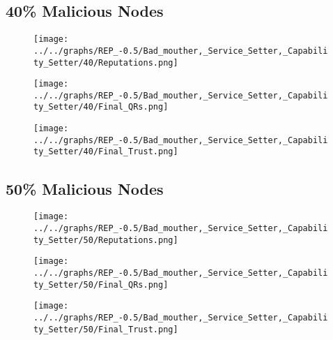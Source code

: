 \begin{minipage}[t]{0.49\columnwidth}
\subsection*{40\% Malicious Nodes}
    \begin{figure}[H]
        \centering
        \texttt{[image: ../../graphs/REP\_-0.5/Bad\_mouther,\_Service\_Setter,\_Capability\_Setter/40/Reputations.png]}
    \end{figure}
    \begin{figure}[H]
        \centering
        \texttt{[image: ../../graphs/REP\_-0.5/Bad\_mouther,\_Service\_Setter,\_Capability\_Setter/40/Final\_QRs.png]}
    \end{figure}
\end{minipage}
\begin{minipage}[t]{0.49\columnwidth}
    \begin{figure}[H]
        \centering
        \texttt{[image: ../../graphs/REP\_-0.5/Bad\_mouther,\_Service\_Setter,\_Capability\_Setter/40/Final\_Trust.png]}
    \end{figure}
\end{minipage}

\begin{minipage}[t]{0.49\columnwidth}
\subsection*{50\% Malicious Nodes}
    \begin{figure}[H]
        \centering
        \texttt{[image: ../../graphs/REP\_-0.5/Bad\_mouther,\_Service\_Setter,\_Capability\_Setter/50/Reputations.png]}
    \end{figure}
    \begin{figure}[H]
        \centering
        \texttt{[image: ../../graphs/REP\_-0.5/Bad\_mouther,\_Service\_Setter,\_Capability\_Setter/50/Final\_QRs.png]}
    \end{figure}
\end{minipage}
\begin{minipage}[t]{0.49\columnwidth}
    \begin{figure}[H]
        \centering
        \texttt{[image: ../../graphs/REP\_-0.5/Bad\_mouther,\_Service\_Setter,\_Capability\_Setter/50/Final\_Trust.png]}
    \end{figure}
\end{minipage}

